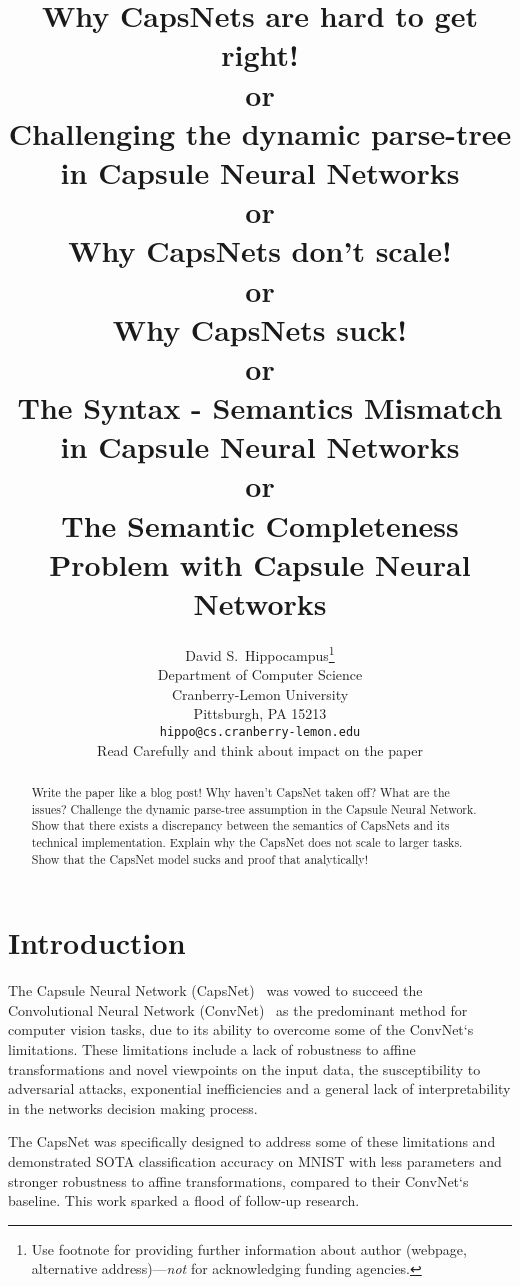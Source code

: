 \documentclass{article}
\title{                                                                                                    \large                                     
	Why CapsNets are hard to get right! \\
	or \\
	Challenging  the dynamic parse-tree in Capsule Neural Networks \\
	or \\
	Why CapsNets don't scale! \\
	or \\
	Why CapsNets suck! \\
	or \\
	The Syntax - Semantics Mismatch in Capsule Neural Networks
	\\
	or \\
	The Semantic Completeness Problem with Capsule Neural Networks
}
\author{%
  David S.~Hippocampus\thanks{Use footnote for providing further information
    about author (webpage, alternative address)---\emph{not} for acknowledging
    funding agencies.} \\
  Department of Computer Science\\
  Cranberry-Lemon University\\
  Pittsburgh, PA 15213 \\
  \texttt{hippo@cs.cranberry-lemon.edu} \\Read Carefully and think about impact on the paper
}
\begin{document}
\maketitle

\begin{abstract}
  Write the paper like a blog post!
  Why haven't CapsNet taken off?
  What are the issues?
  Challenge the dynamic parse-tree assumption in the Capsule Neural Network.
  Show that there exists a discrepancy between the semantics of CapsNets and its technical implementation.
  Explain why the CapsNet does not scale to larger tasks.
  Show that the CapsNet model sucks and proof that analytically!
\end{abstract}

\begin{comment}
	TODO
	- Think about motivation for parse trees, then motivate experiements accordingly
	- Add better less exhaustive introduction
	- Rework related work
	\url{https://en.wikipedia.org/wiki/Completeness_(logic)}
	
	TODO Meta:
	- Argument around Syntax and Semantics like with logical Systems
	- Choose a central argument that builds the core of the overall argumentation line
	- Build everythign else around that argument.
	
	IDEA:
	- Title in parse-tree form
\end{comment}

\section{Introduction}

The Capsule Neural Network (CapsNet)~\cite{nips/SabourFH17} was vowed to succeed the Convolutional Neural Network (ConvNet)~\cite{neco/LeCunBDHHHJ89} as the predominant method for computer vision tasks, due to its ability to overcome some of the ConvNet`s limitations. %
These limitations include
a lack of robustness to affine transformations and novel viewpoints on the input data, 
the susceptibility to adversarial attacks,
exponential inefficiencies
and a general lack of interpretability in the networks decision making process. %

The CapsNet was specifically designed to address some of these limitations and demonstrated SOTA classification accuracy on MNIST with less parameters and stronger robustness to affine transformations, compared to their ConvNet`s baseline. This work sparked a flood of follow-up research.
\end{document}
